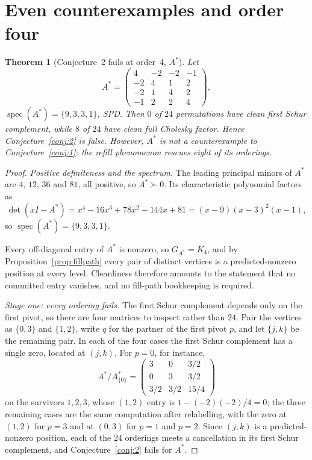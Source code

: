 \documentclass[11pt]{article}
\theoremstyle{plain}
\newtheorem{theorem}{Theorem}[section]
\theoremstyle{definition}
\begin{document}
\section{Even counterexamples and order four}\label{sec:even}
\begin{aiblock}
\begin{theorem}[Conjecture~2 fails at order~4, $A^*$]\label{thm:Astar}
Let
\[
A^*=\begin{pmatrix}4&-2&-2&-1\\-2&4&1&2\\-2&1&4&2\\-1&2&2&4\end{pmatrix},
\]
$\operatorname{spec}(A^*)=\{9,3,3,1\}$, SPD. Then $0$ of $24$ permutations have clean first Schur complement, while $8$ of $24$ have clean full Cholesky factor. Hence Conjecture~\ref{conj:2} is false. However, $A^*$ is not a counterexample to
Conjecture~\ref{conj:1}: the refill phenomenon rescues eight of its orderings.
\end{theorem}
\begin{proof}
\emph{Positive definiteness and the spectrum.} The leading principal minors of $A^*$ are $4$, $12$,
$36$ and $81$, all positive, so $A^*\succ0$. Its characteristic polynomial factors as
\[
  \det(xI-A^*)=x^4-16x^3+78x^2-144x+81=(x-9)(x-3)^2(x-1),
\]
so $\operatorname{spec}(A^*)=\{9,3,3,1\}$.

Every off-diagonal entry of $A^*$ is nonzero, so $G_{A^*}=K_4$, and by
Proposition~\ref{prop:fillpath} every pair of distinct vertices is a predicted-nonzero position at
every level. Cleanliness therefore amounts to the statement that no committed entry vanishes, and no
fill-path bookkeeping is required.

\emph{Stage one: every ordering fails.} The first Schur complement depends only on the first pivot, so
there are four matrices to inspect rather than $24$. Pair the vertices as $\{0,3\}$ and $\{1,2\}$,
write $q$ for the partner of the first pivot $p$, and let $\{j,k\}$ be the remaining pair. In each of
the four cases the first Schur complement has a single zero, located at $(j,k)$. For $p=0$, for
instance,
\[
  A^*/A^*_{\{0\}}=\begin{pmatrix}3&0&3/2\\0&3&3/2\\3/2&3/2&15/4\end{pmatrix}
\]
on the survivors $1,2,3$, whose $(1,2)$ entry is $1-(-2)(-2)/4=0$; the three remaining cases are the
same computation after relabelling, with the zero at $(1,2)$ for $p=3$ and at $(0,3)$ for $p=1$ and
$p=2$. Since $(j,k)$ is a predicted-nonzero position, each of the $24$ orderings meets a cancellation
in its first Schur complement, and Conjecture~\ref{conj:2} fails for $A^*$.


\end{proof}
\end{aiblock}
\end{document}
